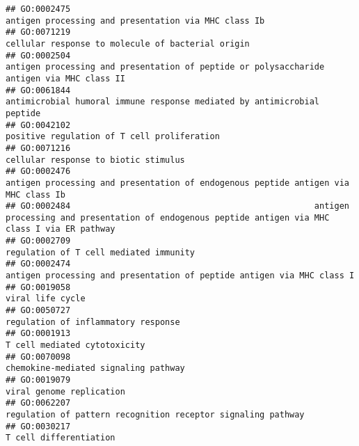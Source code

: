\documentclass[
]{article}
\begin{document}
\begin{verbatim}
## GO:0002475                                                                                             antigen processing and presentation via MHC class Ib
## GO:0071219                                                                                                cellular response to molecule of bacterial origin
## GO:0002504                                                        antigen processing and presentation of peptide or polysaccharide antigen via MHC class II
## GO:0061844                                                                          antimicrobial humoral immune response mediated by antimicrobial peptide
## GO:0042102                                                                                                      positive regulation of T cell proliferation
## GO:0071216                                                                                                             cellular response to biotic stimulus
## GO:0002476                                                               antigen processing and presentation of endogenous peptide antigen via MHC class Ib
## GO:0002484                                                 antigen processing and presentation of endogenous peptide antigen via MHC class I via ER pathway
## GO:0002709                                                                                                           regulation of T cell mediated immunity
## GO:0002474                                                                           antigen processing and presentation of peptide antigen via MHC class I
## GO:0019058                                                                                                                                 viral life cycle
## GO:0050727                                                                                                              regulation of inflammatory response
## GO:0001913                                                                                                                     T cell mediated cytotoxicity
## GO:0070098                                                                                                             chemokine-mediated signaling pathway
## GO:0019079                                                                                                                         viral genome replication
## GO:0062207                                                                                     regulation of pattern recognition receptor signaling pathway
## GO:0030217                                                                                                                           T cell differentiation

\end{verbatim}
\end{document}
